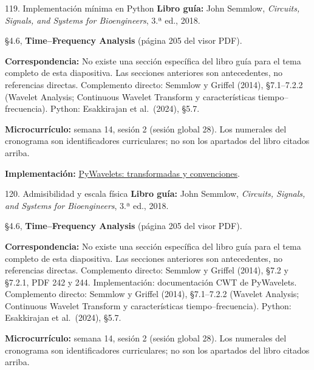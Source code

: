 \documentclass[
  10pt,
  ignorenonframetext,
  aspectratio=169,
  spanish,
]{beamer}
\begin{document}
\begin{frame}{119. Implementación mínima en Python}
\label{implementaciuxf3n-muxednima-en-python-7}
\textbf{Libro guía:} John Semmlow, \emph{Circuits, Signals, and Systems
for Bioengineers}, 3.ª ed., 2018.

§4.6, \textbf{Time--Frequency Analysis} (página 205 del visor PDF).

\textbf{Correspondencia:} No existe una sección específica del libro
guía para el tema completo de esta diapositiva. Las secciones anteriores
son antecedentes, no referencias directas. Complemento directo: Semmlow
y Griffel (2014), §7.1--7.2.2 (Wavelet Analysis; Continuous Wavelet
Transform y características tiempo--frecuencia). Python: Esakkirajan et
al.~(2024), §5.7.

\textbf{Microcurrículo:} semana 14, sesión 2 (sesión global 28). Los
numerales del cronograma son identificadores curriculares; no son los
apartados del libro citados arriba.

\textbf{Implementación:}
\href{https://pywavelets.readthedocs.io/en/latest/ref/index.html}{PyWavelets:
transformadas y convenciones}.
\end{frame}

\begin{frame}{120. Admisibilidad y escala física}
\label{admisibilidad-y-escala-fuxedsica}
\textbf{Libro guía:} John Semmlow, \emph{Circuits, Signals, and Systems
for Bioengineers}, 3.ª ed., 2018.

§4.6, \textbf{Time--Frequency Analysis} (página 205 del visor PDF).

\textbf{Correspondencia:} No existe una sección específica del libro
guía para el tema completo de esta diapositiva. Las secciones anteriores
son antecedentes, no referencias directas. Complemento directo: Semmlow
y Griffel (2014), §7.2 y §7.2.1, PDF 242 y 244. Implementación:
documentación CWT de PyWavelets. Complemento directo: Semmlow y Griffel
(2014), §7.1--7.2.2 (Wavelet Analysis; Continuous Wavelet Transform y
características tiempo--frecuencia). Python: Esakkirajan et al.~(2024),
§5.7.

\textbf{Microcurrículo:} semana 14, sesión 2 (sesión global 28). Los
numerales del cronograma son identificadores curriculares; no son los
apartados del libro citados arriba.
\end{frame}
\end{document}
